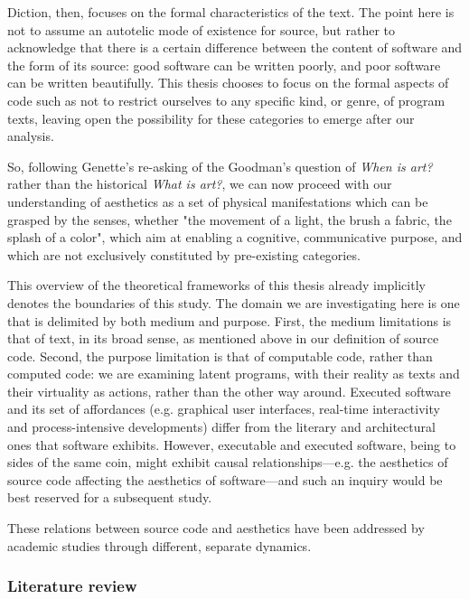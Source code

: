 Diction, then, focuses on the formal characteristics of the text. The point here is not to assume an autotelic mode of existence for source, but rather to acknowledge that there is a certain difference between the content of software and the form of its source: good software can be written poorly, and poor software can be written beautifully. This thesis chooses to focus on the formal aspects of code such as not to restrict ourselves to any specific kind, or genre, of program texts, leaving open the possibility for these categories to emerge after our analysis.

So, following Genette's re-asking of the Goodman's question of \emph{When is art?} rather than the historical \emph{What is art?}, we can now proceed with our understanding of aesthetics as a set of physical manifestations which can be grasped by the senses, whether "the movement of a light, the brush a fabric, the splash of a color"\cite{ranciere_aisthesis_2013}, which aim at enabling a cognitive, communicative purpose, and which are not exclusively constituted by pre-existing categories.

This overview of the theoretical frameworks of this thesis already implicitly denotes the boundaries of this study. The domain we are investigating here is one that is delimited by both medium and purpose. First, the medium limitations is that of text, in its broad sense, as mentioned above in our definition of source code. Second, the purpose limitation is that of computable code, rather than computed code: we are examining latent programs, with their reality as texts and their virtuality as actions, rather than the other way around. Executed software and its set of affordances (e.g. graphical user interfaces\cite{gelernter_machine_1998}, real-time interactivity\cite{laurel_computers_1993} and process-intensive developments\cite{murray_hamlet_1998}) differ from the literary and architectural ones that software exhibits. However, executable and executed software, being to sides of the same coin, might exhibit causal relationships—e.g. the aesthetics of source code affecting the aesthetics of software—and such an inquiry would be best reserved for a subsequent study.

These relations between source code and aesthetics have been addressed by academic studies through different, separate dynamics.

\subsubsection{Literature review}


